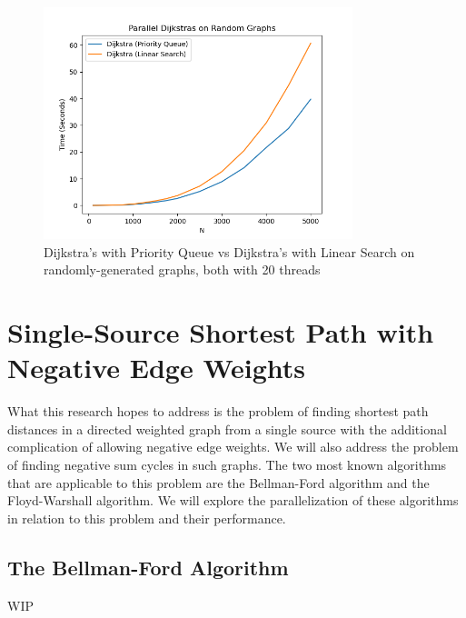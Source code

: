 \documentclass[conference]{IEEEtran}
\begin{document}
\begin{figure}[t]
    
\end{figure}



\begin{figure}[t]
    \centering
    \includegraphics[width=9cm]{images/benchdijkstra.png}
    \caption{Dijkstra's with Priority Queue vs Dijkstra's with Linear Search on randomly-generated graphs, both with 20 threads}
    \label{fig:dijkstra_both}
\end{figure}

\break
\newpage

\section{Single-Source Shortest Path with Negative Edge Weights}
What this research hopes to address is the problem of finding shortest path distances in a directed weighted graph from a single source with the additional complication of allowing negative edge weights. We will also address the problem of finding negative sum cycles in such graphs. The two most known algorithms that are applicable to this problem are the Bellman-Ford algorithm and the Floyd-Warshall algorithm. We will explore the parallelization of these algorithms in relation to this problem and their performance.

\subsection{The Bellman-Ford Algorithm}\label{AA}
WIP


\end{document}
